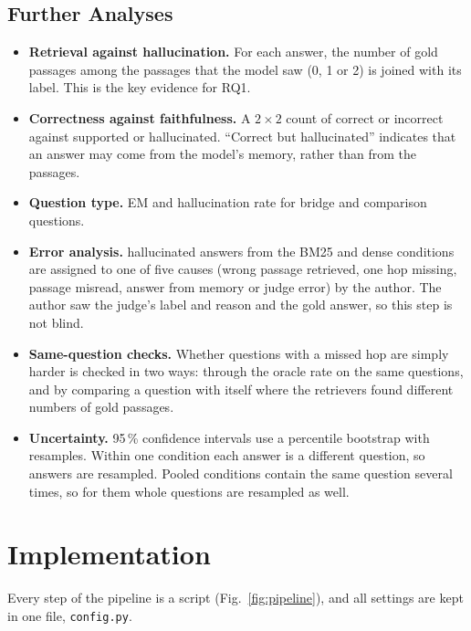 \subsection{Further Analyses}
\begin{itemize}
\item \textbf{Retrieval against hallucination.} For each answer, the number of gold passages among the
  passages that the model saw (0, 1 or 2) is joined with its label. This is the key evidence for RQ1.
\item \textbf{Correctness against faithfulness.} A $2\times2$ count of correct or incorrect against
  supported or hallucinated. ``Correct but hallucinated'' indicates that an answer may come from the
  model's memory, rather than from the passages.
\item \textbf{Question type.} EM and hallucination rate for bridge and comparison questions.
\item \textbf{Error analysis.}  hallucinated answers from the BM25 and dense conditions
  are assigned to one of five causes (wrong passage retrieved, one hop missing, passage misread, answer
  from memory or judge error) by the author. The author saw the judge's label and reason and the gold
  answer, so this step is not blind.
\item \textbf{Same-question checks.} Whether questions with a missed hop are simply harder is checked in two
  ways: through the oracle rate on the same questions, and by comparing a question with itself where the
  retrievers found different numbers of gold passages.
\item \textbf{Uncertainty.} 95\,\% confidence intervals use a percentile bootstrap
  \cite{efron1993bootstrap} with  resamples. Within one condition each answer is a
  different question, so answers are resampled. Pooled conditions contain the same question several times, so
  for them whole questions are resampled as well.
\end{itemize}

\section{Implementation}\label{sec:implementation}
Every step of the pipeline is a script (Fig.~\ref{fig:pipeline}), and all settings are kept in one file,
\texttt{config.py}.

